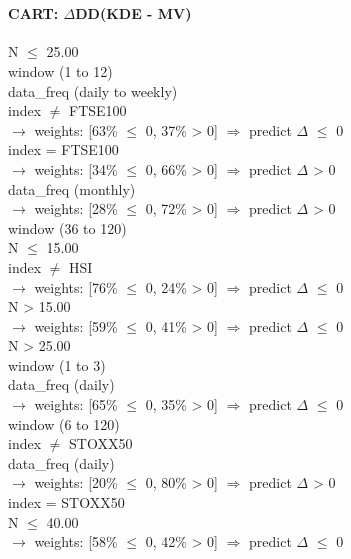 \
\paragraph{CART: $\Delta$DD(KDE - MV)}

\begin{flushleft}
\ttfamily %
N $\leq$ 25.00 \\
\quad window (1 to 12) \\
\quad \quad data\_freq (daily to weekly) \\
\quad \quad \quad index $\neq$ FTSE100 \\
\quad \quad \quad \quad $\rightarrow$ weights: [63\% $\leq$ 0, 37\% > 0] $\Rightarrow$ predict $\Delta$ $\leq$ 0 \\
\quad \quad \quad index = FTSE100 \\
\quad \quad \quad \quad $\rightarrow$ weights: [34\% $\leq$ 0, 66\% > 0] $\Rightarrow$ predict $\Delta$ > 0 \\
\quad \quad data\_freq (monthly) \\
\quad \quad \quad \quad $\rightarrow$ weights: [28\% $\leq$ 0, 72\% > 0] $\Rightarrow$ predict $\Delta$ > 0 \\
\quad window (36 to 120) \\
\quad \quad N $\leq$ 15.00 \\
\quad \quad \quad index $\neq$ HSI \\
\quad \quad \quad \quad $\rightarrow$ weights: [76\% $\leq$ 0, 24\% > 0] $\Rightarrow$ predict $\Delta$ $\leq$ 0 \\
\quad \quad N > 15.00 \\
\quad \quad \quad \quad $\rightarrow$ weights: [59\% $\leq$ 0, 41\% > 0] $\Rightarrow$ predict $\Delta$ $\leq$ 0 \\
N > 25.00 \\
\quad window (1 to 3) \\
\quad \quad data\_freq (daily) \\
\quad \quad \quad \quad $\rightarrow$ weights: [65\% $\leq$ 0, 35\% > 0] $\Rightarrow$ predict $\Delta$ $\leq$ 0 \\
\quad window (6 to 120) \\
\quad \quad index $\neq$ STOXX50 \\
\quad \quad \quad data\_freq (daily) \\
\quad \quad \quad \quad $\rightarrow$ weights: [20\% $\leq$ 0, 80\% > 0] $\Rightarrow$ predict $\Delta$ > 0 \\
\quad \quad index = STOXX50 \\
\quad \quad \quad N $\leq$ 40.00 \\
\quad \quad \quad \quad $\rightarrow$ weights: [58\% $\leq$ 0, 42\% > 0] $\Rightarrow$ predict $\Delta$ $\leq$ 0 \\
\end{flushleft}
